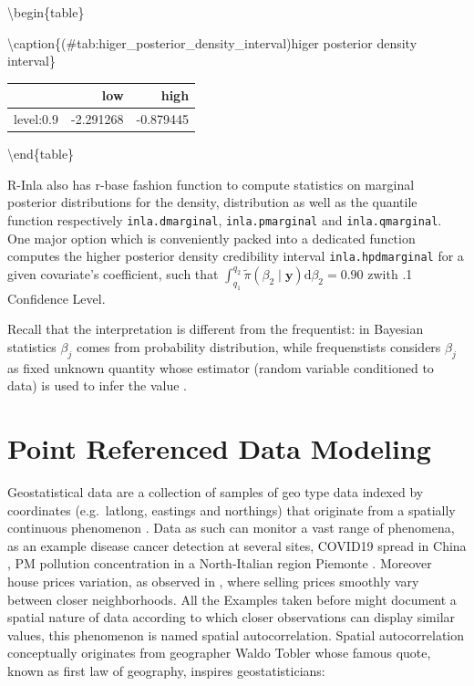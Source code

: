 \documentclass[
  12pt,
  a4paper,
  oneside]{book}
\theoremstyle{definition}
\theoremstyle{definition}
\theoremstyle{definition}
\theoremstyle{remark}
\begin{document}
\textbackslash begin\{table\}

\textbackslash caption\{(\#tab:higer\_posterior\_density\_interval)higer posterior density interval\}
\centering

\begin{tabular}[t]{lrr}
\toprule
  & low & high\\
\midrule
level:0.9 & -2.291268 & -0.879445\\
\bottomrule
\end{tabular}

\textbackslash end\{table\}

R-Inla also has r-base fashion function to compute statistics on marginal posterior distributions for the density, distribution as well as the quantile function respectively \texttt{inla.dmarginal}, \texttt{inla.pmarginal} and \texttt{inla.qmarginal}. One major option which is conveniently packed into a dedicated function computes the higher posterior density credibility interval \texttt{inla.hpdmarginal} for a given covariate's coefficient, such that \(\int_{q_{1}}^{q_{2}} \tilde{\pi}\left(\beta_{2} \mid \boldsymbol{y}\right) \mathrm{d} \beta_{2}=0.90\) zwith .1 Confidence Level.

Recall that the interpretation is different from the frequentist: in Bayesian statistics \(\beta_{j}\) comes from probability distribution, while frequenstists considers \(\beta_{j}\) as fixed unknown quantity whose estimator (random variable conditioned to data) is used to infer the value \citeyearpar{Blangiardo-Cameletti}.

\hypertarget{prdm}{%
\chapter{Point Referenced Data Modeling}\label{prdm}}

Geostatistical data are a collection of samples of geo type data indexed by coordinates (e.g.~latlong, eastings and northings) that originate from a spatially continuous phenomenon \citep{Moraga2019}. Data as such can monitor a vast range of phenomena, as an example disease cancer detection \citep{Bell2006} at several sites, COVID19 spread in China \citep{Li_Li_Ding_Hu_Chen_Wang_Peng_Shen_2020}, PM pollution concentration in a North-Italian region Piemonte \citep{Cameletti2012}. Moreover house prices variation, as observed in \citet{Bayesian_INLA_Rubio}, where selling prices smoothly vary between closer neighborhoods. All the Examples taken before might document a spatial nature of data according to which closer observations can display similar values, this phenomenon is named spatial autocorrelation. Spatial autocorrelation conceptually originates from geographer Waldo Tobler whose famous quote, known as first law of geography, inspires geostatisticians:
\end{document}
